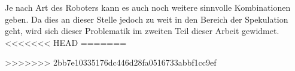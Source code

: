 Je nach Art des Roboters kann es auch noch weitere sinnvolle Kombinationen geben. Da dies an dieser Stelle jedoch zu weit in den Bereich der Spekulation geht,
wird sich dieser Problematik im zweiten Teil dieser Arbeit gewidmet.
<<<<<<< HEAD
=======





>>>>>>> 2bb7e10335176dc446d28fa0516733abbf1cc9ef
